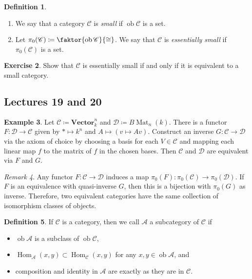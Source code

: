 \documentclass[10pt,letterpaper,cm]{nupset}
\theoremstyle{definition}
\newtheorem{definition}{Definition}[subsection]
\newtheorem{exmp}[definition]{Example}
\theoremstyle{theorem}
\newtheorem{exercise}[definition]{Exercise}
\theoremstyle{remark}
\newtheorem{remark}[definition]{Remark}
\newcommand{\1}{\mathbf{1}}
\renewcommand{\a}{\mathscr{A}}
\renewcommand{\c}{\mathscr{C}}
\renewcommand{\d}{\mathscr{D}}
\newcommand{\0}{\vec 0}
\DeclareMathOperator{\ob}{ob}
\DeclareMathOperator{\Mat}{Mat}
\DeclareMathOperator{\Hom}{Hom}
\begin{document}
\begin{definition} $ $
\begin{enumerate}
\item We say that a category $\c$ is \textit{small} if $\ob{\c}$ is a set.
\item Let $\pi_0(\c) \coloneqq  \faktor{\ob \c}{\cong}$. We say that $\c$ is \textit{essentially small} if $\pi_0(\c)$ is a set.
\end{enumerate}
\end{definition}

\begin{exercise}
Show that $\c$ is essentially small  if and only if it is equivalent to a small category. 
\end{exercise}

\subsection{Lectures 19 and 20}

\begin{exmp} 
Let $\c \coloneqq  \mathbf{Vector}_k^n$ and $\d \coloneqq  B\Mat_n(k)$. There is a functor $F : \d \to \c$ given by $\ast \mapsto k^n$ and $A \mapsto (v \mapsto Av)$. Construct an inverse $G: \c \to \d$ via the axiom of choice by choosing a basis for each $V \in \c$ and mapping each linear map $f$ to the matrix of $f$ in the chosen bases. Then $\c$ and $\d$ are equivalent via $F$ and $G$.
\end{exmp}

\begin{remark}
Any functor $F: \c \to \d$ induces a map $\pi_0(F) : \pi_0(\c) \to \pi_0(\d)$. If $F$ is an equivalence with quasi-inverse $G$, then this is a bijection with $\pi_0(G)$ as inverse. Therefore, two equivalent categories have the same collection of isomorphism classes of objects.
\end{remark}


\begin{definition}
If $\c$ is a category, then we call $\a$ a subcategory of $\c$ if
\begin{itemize}
\item $\ob{\a}$ is a subclass of $\ob{\c}$, 
\item $\Hom_{\a}(x,y) \subset \Hom_{\c}(x,y)$ for any $x,y\in \ob{\a}$, and
\item composition and identity in $\a$ are exactly as they are in $\c$.
\end{itemize}
\end{definition}
\end{document}

